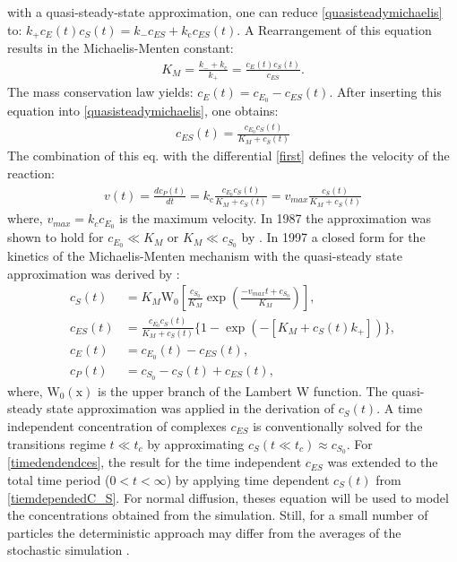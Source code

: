 \documentclass[
  a4paper,BCOR10mm,oneside,
  headsepline,footsepline,%
  fleqn,openbib
]{scrbook}
\begin{document}
with a quasi-steady-state approximation, one can reduce \cref{quasisteadymichaelis} to: $ k_{\mathrm{+}}c_E(t) c_S(t)=k_{\mathrm{-}}c_{ES}+k_{\mathrm{c}}c_{ES}(t)$. A Rearrangement of this equation results in the Michaelis-Menten constant:
\begin{align}
 K_M=\frac{k_{\mathrm{-}}+k_{\mathrm{c}}}{k_{\mathrm{+}}}=\frac{c_E(t) c_S(t)}{c_{ES}}. 
\end{align}
The mass conservation law yields: $c_E(t)=c_{E_0} -c_{ES}(t)$. After inserting this equation into \cref{quasisteadymichaelis}, one obtains:
\begin{align}
 c_{ES}(t)=\frac{c_{E_0} c_S(t)}{K_M+c_S(t)}
\end{align}
The combination of this eq. with the differential \cref{first} defines the velocity of the reaction:
\begin{align}
 v(t)= \frac{dc_P(t)}{dt}= k_{\mathrm{c}} \frac{c_{E_0} c_S(t)}{K_M+c_S(t)} = v_{max} \frac{c_S(t)}{K_M+c_S(t)}  
\end{align}
where, $v_{max}=k_c c_{E_0}$ is the maximum velocity. In 1987 the approximation was shown to hold for $c_{E_0}\ll K_M \text{ or } K_M \ll c_{S_0}$ by \citet{Palsson1987}. In 1997 a closed form for the kinetics of the Michaelis-Menten mechanism with the quasi-steady state approximation was derived by  \citet{Schnell1997}:
\begin{align}
 c_S(t)&=K_M \mathrm{W_0}\left[\frac{c_{S_0}}{K_M} \exp \left( \frac{-v_{max} t + c_{S_0}}{K_M}\right)\right],  \label{tiemdependedC_S} \\
 c_{ES}(t)&= \frac{c_{E_0} c_S(t)}{K_M+c_S(t)} \lbrace 1- \exp \left( - \left[ K_M + c_S(t) k_{+} \right] \right) \rbrace, \label{timedendendces}\\ 
 c_{E}(t)&=c_{E_0}(t)-c_{ES}(t), \label{timedendendce}\\
 c_{P}(t)&=c_{S_0}-c_S(t)+c_{ES}(t), \label{timedendendcp}
\end{align}
where,  $\mathrm{W_0(x)}$ is the upper branch of the Lambert W function. The quasi-steady state approximation was applied in the derivation of $c_S(t)$. A time independent   concentration of complexes $c_{ES}$ is conventionally solved for the transitions regime $t \ll t_c$ by approximating $c_S(t \ll t_c) \approx c_{S_0}$. For \cref{timedendendces}, the result for the time independent $c_{ES}$ was extended to the total time period ($0<t<\infty$) by applying time dependent $c_S(t)$ from \cref{tiemdependedC_S}. For normal diffusion, theses equation will be used to model the concentrations obtained from the simulation.  Still, for a small number of particles the deterministic approach may differ from the averages of the stochastic simulation \cite{Turner2004}.\par
\end{document}
